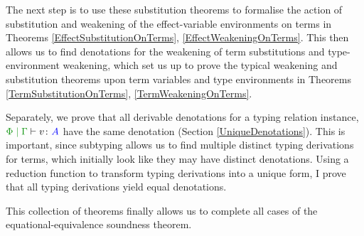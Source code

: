The next step is to use these substitution theorems to formalise the action of substitution and weakening of the effect-variable environments on terms in Theorems \ref{EffectSubstitutionOnTerms}, \ref{EffectWeakeningOnTerms}. This then allows us to find denotations for the weakening of term substitutions and type-environment weakening, which set us up to prove the typical weakening and substitution theorems upon term variables and type environments in Theorems \ref{TermSubstitutionOnTerms}, \ref{TermWeakeningOnTerms}. 

Separately, we prove that all derivable denotations for a typing relation instance, $\gpetyperelation{v}{A}$ have the same denotation (Section \ref{UniqueDenotations}). This is important, since subtyping allows us to find multiple distinct typing derivations for terms, which initially look like they may have distinct denotations. Using a reduction function to transform typing derivations into a unique form, I prove that all typing derivations yield equal denotations.

This collection of theorems finally allows us to complete all cases of the equational-equivalence soundness theorem.

